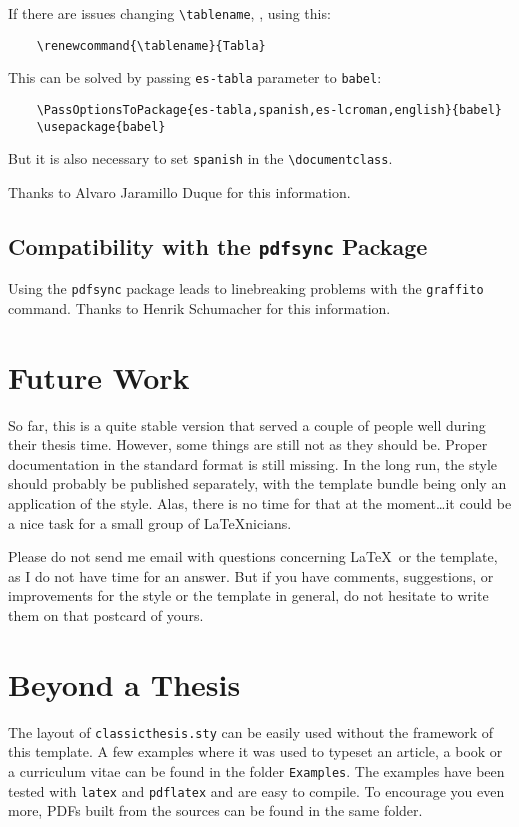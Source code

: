 If there are issues changing \verb|\tablename|, \eg, using this:
\begin{lstlisting}
    \renewcommand{\tablename}{Tabla}
\end{lstlisting}

This can be solved by passing \texttt{es-tabla} parameter to \texttt{babel}:
\begin{lstlisting}
    \PassOptionsToPackage{es-tabla,spanish,es-lcroman,english}{babel}
    \usepackage{babel}
\end{lstlisting}

But it is also necessary to set \texttt{spanish} in the \verb|\documentclass|.

Thanks to Alvaro Jaramillo Duque for this information. 


\subsection*{Compatibility with the \texttt{pdfsync} Package}
Using the \texttt{pdfsync} package leads to linebreaking problems with the \texttt{graffito} command. 
Thanks to Henrik Schumacher for this information. 



\section{Future Work}
So far, this is a quite stable version that served a couple of people
well during their thesis time. However, some things are still not as
they should be. Proper documentation in the standard format is still
missing. In the long run, the style should probably be published
separately, with the template bundle being only an application of the
style. Alas, there is no time for that at the moment\dots it could be
a nice task for a small group of \LaTeX nicians.

Please do not send me email with questions concerning \LaTeX\ or the
template, as I do not have time for an answer. But if you have
comments, suggestions, or improvements for the style or the template
in general, do not hesitate to write them on that postcard of yours.


\section{Beyond a Thesis}
The layout of \texttt{classicthesis.sty} can be easily used without the
framework of this template. A few examples where it was used to typeset 
an article, a book or a curriculum vitae can be found in the folder 
\texttt{Examples}. The examples have been tested with  
\texttt{latex} and \texttt{pdflatex} and are easy to compile. To 
encourage you even more, PDFs built from the sources can be found in the 
same folder. 

